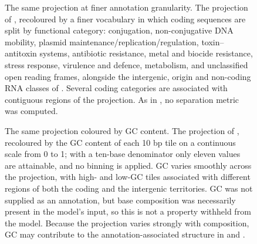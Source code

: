 \begin{figure}[h]
    \centering
\caption{
The same projection at finer annotation granularity. The projection of , recoloured by a finer vocabulary in which coding sequences are split by functional category: conjugation, non-conjugative DNA mobility, plasmid maintenance/replication/regulation, toxin--antitoxin systems, antibiotic resistance, metal and biocide resistance, stress response, virulence and defence, metabolism, and unclassified open reading frames, alongside the intergenic, origin and non-coding RNA classes of . Several coding categories are associated with contiguous regions of the projection. As in , no separation metric was computed.
}
\label{fig:supp-umap-detailed}
\end{figure}

\begin{figure}[h]
    \centering
\caption{
The same projection coloured by GC content. The projection of , recoloured by the GC content of each 10 bp tile on a continuous scale from 0 to 1; with a ten-base denominator only eleven values are attainable, and no binning is applied. GC varies smoothly across the projection, with high- and low-GC tiles associated with different regions of both the coding and the intergenic territories. GC was not supplied as an annotation, but base composition was necessarily present in the model's input, so this is not a property withheld from the model. Because the projection varies strongly with composition, GC may contribute to the annotation-associated structure in  and .
}
\label{fig:supp-umap-gc}
\end{figure}

